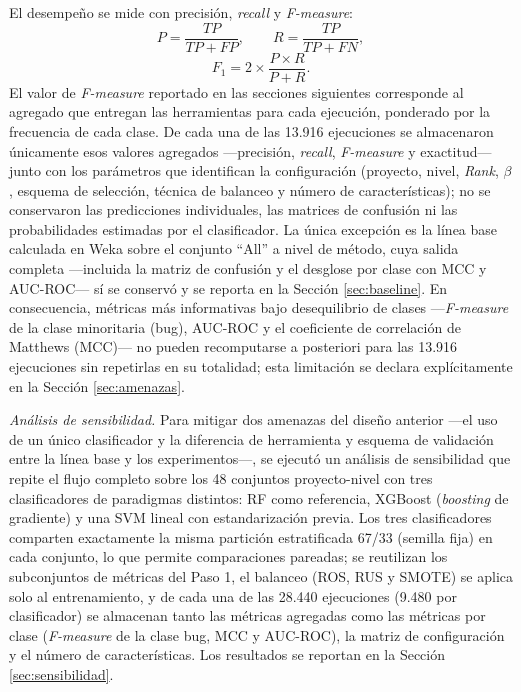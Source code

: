 \documentclass[conference,a4paper]{IEEEtran}
\begin{document}
El desempeño se mide con precisión, \textit{recall} y \textit{F-measure}:
\begin{equation}
P = \frac{TP}{TP+FP}, \qquad R = \frac{TP}{TP+FN},
\label{eq:pr}
\end{equation}
\begin{equation}
F_{1} = 2 \times \frac{P \times R}{P + R}.
\label{eq:f1}
\end{equation}
El valor de \textit{F-measure} reportado en las secciones siguientes corresponde al agregado que entregan las herramientas para cada ejecución, ponderado por la frecuencia de cada clase. De cada una de las 13.916 ejecuciones se almacenaron únicamente esos valores agregados ---precisión, \textit{recall}, \textit{F-measure} y exactitud--- junto con los parámetros que identifican la configuración (proyecto, nivel, \textit{Rank}, $\beta$, esquema de selección, técnica de balanceo y número de características); no se conservaron las predicciones individuales, las matrices de confusión ni las probabilidades estimadas por el clasificador. La única excepción es la línea base calculada en Weka sobre el conjunto ``All'' a nivel de método, cuya salida completa ---incluida la matriz de confusión y el desglose por clase con MCC y AUC-ROC--- sí se conservó y se reporta en la Sección \ref{sec:baseline}. En consecuencia, métricas más informativas bajo desequilibrio de clases ---\textit{F-measure} de la clase minoritaria (bug), AUC-ROC y el coeficiente de correlación de Matthews (MCC)--- no pueden recomputarse a posteriori para las 13.916 ejecuciones sin repetirlas en su totalidad; esta limitación se declara explícitamente en la Sección \ref{sec:amenazas}.

\textit{Análisis de sensibilidad.} Para mitigar dos amenazas del diseño anterior ---el uso de un único clasificador y la diferencia de herramienta y esquema de validación entre la línea base y los experimentos---, se ejecutó un análisis de sensibilidad que repite el flujo completo sobre los 48 conjuntos proyecto-nivel con tres clasificadores de paradigmas distintos: RF como referencia, XGBoost \cite{chen2016} (\textit{boosting} de gradiente) y una SVM lineal \cite{cortes1995} con estandarización previa. Los tres clasificadores comparten exactamente la misma partición estratificada 67/33 (semilla fija) en cada conjunto, lo que permite comparaciones pareadas; se reutilizan los subconjuntos de métricas del Paso 1, el balanceo (ROS, RUS y SMOTE) se aplica solo al entrenamiento, y de cada una de las 28.440 ejecuciones (9.480 por clasificador) se almacenan tanto las métricas agregadas como las métricas por clase (\textit{F-measure} de la clase bug, MCC y AUC-ROC), la matriz de configuración y el número de características. Los resultados se reportan en la Sección \ref{sec:sensibilidad}.
\end{document}
